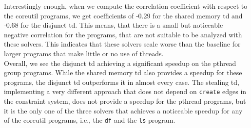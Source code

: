   Interestingly enough, when we compute the correlation coefficient with respect to the coreutil programs, we get coefficients of -0.29 for the shared memory \ac{td} and -0.68 for the disjunct td. This means, that there is a small but noticeable negative correlation for the programs, that are not suitable to be analyzed with these solvers. This indicates that these solvers scale worse than the baseline for larger programs that make little or no use of threads.\\
  Overall, we see the disjunct \ac{td} achieving a significant speedup on the pthread group programs. While the shared memory \ac{td} also provides a speedup for these programs, the disjunct \ac{td} outperforms it in almost every case. The stealing \ac{td}, implementing a very different approach that does not depend on \texttt{create} edges in the constraint system, does not provide a speedup for the pthread programs, but it is the only one of the three solvers that achieves a noticeable speedup for any of the coreutil programs, i.e., the \texttt{df} and the \texttt{ls} program.
